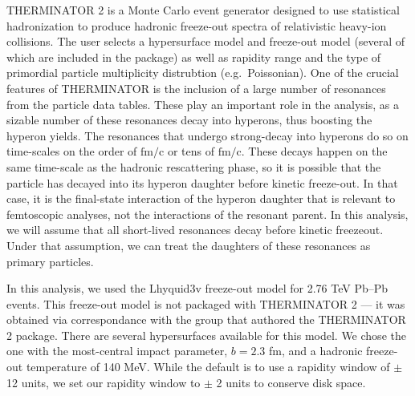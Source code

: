 THERMINATOR 2 is a Monte Carlo event generator designed to use statistical hadronization to produce hadronic freeze-out spectra of relativistic heavy-ion collisions. 
The user selects a hypersurface model and freeze-out model (several of which are included in the package) as well as rapidity range and the type of primordial particle multiplicity distrubtion (e.g.\ Poissonian). 
One of the crucial features of THERMINATOR is the inclusion of a large number of resonances from the particle data tables. 
These play an important role in the analysis, as a sizable number of these resonances decay into hyperons, thus boosting the hyperon yields. 
The resonances that undergo strong-decay into hyperons do so on time-scales on the order of $\mathrm{fm}/\mathrm{c}$ or tens of $\mathrm{fm}/\mathrm{c}$. 
These decays happen on the same time-scale as the hadronic rescattering phase, so it is possible that the particle has decayed into its hyperon daughter before kinetic freeze-out. 
In that case, it is the final-state interaction of the hyperon daughter that is relevant to femtoscopic analyses, not the interactions of the resonant parent.  
In this analysis, we will assume that all short-lived resonances decay before kinetic freezeout. 
Under that assumption, we can treat the daughters of these resonances as primary particles. 

In this analysis, we used the Lhyquid3v freeze-out model for 2.76 TeV Pb--Pb events. This freeze-out model is not packaged with THERMINATOR 2 --- it was obtained via correspondance with the group that authored the THERMINATOR 2 package.
There are several hypersurfaces available for this model.
We chose the one with the most-central impact parameter, $b = 2.3$ fm, and a hadronic freeze-out temperature of 140 MeV.
While the default is to use a rapidity window of $\pm$ 12 units, we set our rapidity window to $\pm$ 2 units to conserve disk space.

